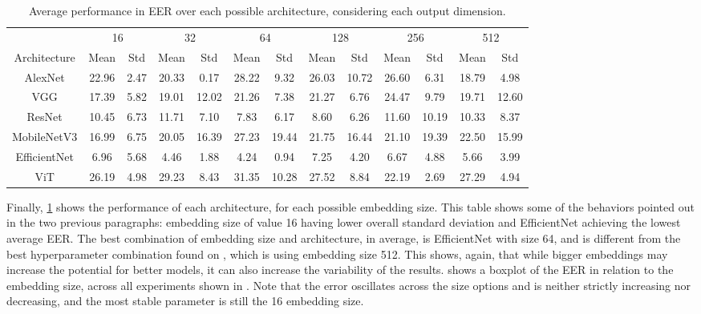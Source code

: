 \begin{table}[t!]
\centering
\caption{Average performance in \gls{EER} over each possible architecture, considering each output dimension.}
\label{tab:architecture_dim_agg}
\setlength{\tabcolsep}{4pt}
\footnotesize 
\begin{tabular}{ccc|cc|cc|cc|cc|cc}
& \multicolumn{2}{c}{16} & \multicolumn{2}{c}{32} & \multicolumn{2}{c}{64} & \multicolumn{2}{c}{128} & \multicolumn{2}{c}{256} & \multicolumn{2}{c}{512} \\
\cmidrule(lr){2-3} \cmidrule(lr){4-5} \cmidrule(lr){6-7} \cmidrule(lr){8-9} \cmidrule(lr){10-11} \cmidrule(lr){12-13}
Architecture & Mean & Std & Mean & Std & Mean & Std  & Mean & Std & Mean & Std & Mean & Std\\
\midrule
AlexNet         & 22.96 & 2.47 & 20.33 & 0.17  & 28.22 & 9.32  & 26.03 & 10.72 & 26.60 & 6.31  & 18.79 & 4.98 \\
VGG             & 17.39 & 5.82 & 19.01 & 12.02 & 21.26 & 7.38  & 21.27 & 6.76  & 24.47 & 9.79  & 19.71 & 12.60 \\
ResNet          & 10.45 & 6.73 & 11.71 & 7.10  & 7.83  & 6.17  & 8.60  & 6.26  & 11.60 & 10.19 & 10.33 & 8.37 \\
MobileNetV3     & 16.99 & 6.75 & 20.05 & 16.39 & 27.23 & 19.44 & 21.75 & 16.44 & 21.10 & 19.39 & 22.50 & 15.99 \\
EfficientNet    & 6.96  & 5.68 & 4.46  & 1.88  & 4.24  & 0.94  & 7.25  & 4.20  & 6.67  & 4.88  & 5.66  & 3.99 \\
ViT             & 26.19 & 4.98 & 29.23 & 8.43  & 31.35 & 10.28 & 27.52 & 8.84  & 22.19 & 2.69  & 27.29 & 4.94 \\
\bottomrule
\end{tabular}
\end{table}

Finally, \ref{tab:architecture_dim_agg} shows the performance of each architecture, for each possible embedding size. This table shows some of the behaviors pointed out in the two previous paragraphs: embedding size of value 16 having lower overall standard deviation and EfficientNet achieving the lowest average \gls{EER}. The best combination of embedding size and architecture, in average, is EfficientNet with size 64, and is different from the best hyperparameter combination found on , which is using embedding size 512. This shows, again, that while bigger embeddings may increase the potential for better models, it can also increase the variability of the results.  shows a boxplot of the \gls{EER} in relation to the embedding size, across all experiments shown in . Note that the error oscillates across the size options and is neither strictly increasing nor decreasing, and the most stable parameter is still the 16 embedding size.

